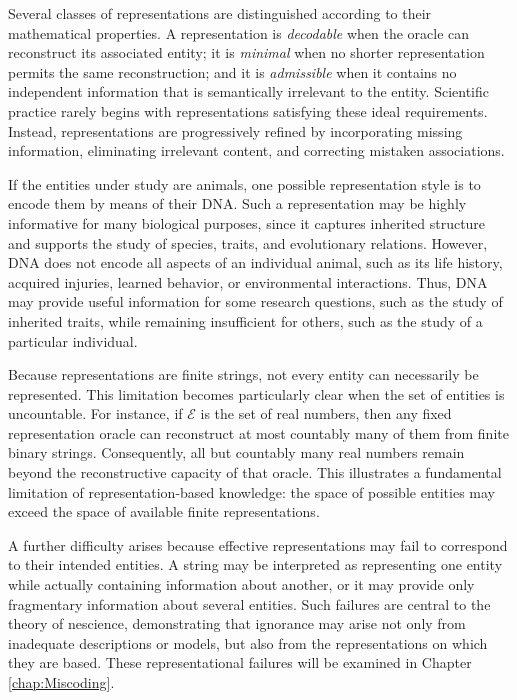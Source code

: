 Several classes of representations are distinguished according to their mathematical properties. A representation is \emph{decodable} when the oracle can reconstruct its associated entity; it is \emph{minimal} when no shorter representation permits the same reconstruction; and it is \emph{admissible} when it contains no independent information that is semantically irrelevant to the entity. Scientific practice rarely begins with representations satisfying these ideal requirements. Instead, representations are progressively refined by incorporating missing information, eliminating irrelevant content, and correcting mistaken associations.

\begin{example}
\label{ex:animals_DNA}
If the entities under study are animals, one possible representation style is to encode them by means of their DNA. Such a representation may be highly informative for many biological purposes, since it captures inherited structure and supports the study of species, traits, and evolutionary relations. However, DNA does not encode all aspects of an individual animal, such as its life history, acquired injuries, learned behavior, or environmental interactions. Thus, DNA may provide useful information for some research questions, such as the study of inherited traits, while remaining insufficient for others, such as the study of a particular individual.
\end{example}

Because representations are finite strings, not every entity can necessarily be represented. This limitation becomes particularly clear when the set of entities is uncountable. For instance, if $\mathcal{E}$ is the set of real numbers, then any fixed representation oracle can reconstruct at most countably many of them from finite binary strings. Consequently, all but countably many real numbers remain beyond the reconstructive capacity of that oracle. This illustrates a fundamental limitation of representation-based knowledge: the space of possible entities may exceed the space of available finite representations.

A further difficulty arises because effective representations may fail to correspond to their intended entities. A string may be interpreted as representing one entity while actually containing information about another, or it may provide only fragmentary information about several entities. Such failures are central to the theory of nescience, demonstrating that ignorance may arise not only from inadequate descriptions or models, but also from the representations on which they are based. These representational failures will be examined in Chapter \ref{chap:Miscoding}.

